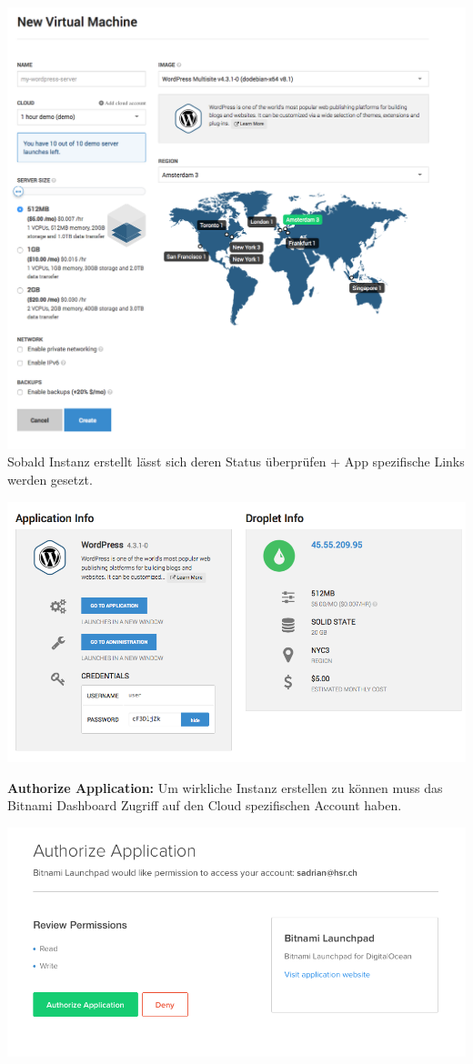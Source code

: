 \documentclass[11pt]{scrartcl}
\begin{document}
\includegraphics[width=\textwidth]{digitalocean_size}
Sobald Instanz erstellt lässt sich deren Status überprüfen + App spezifische 
Links werden gesetzt.

\includegraphics[width=\textwidth]{digitalocean_infos}

\textbf{Authorize Application:}
Um wirkliche Instanz erstellen zu können muss das Bitnami Dashboard Zugriff auf 
den Cloud spezifischen Account haben.

\includegraphics[width=\textwidth]{digitalocean_authorize}
\end{document}
